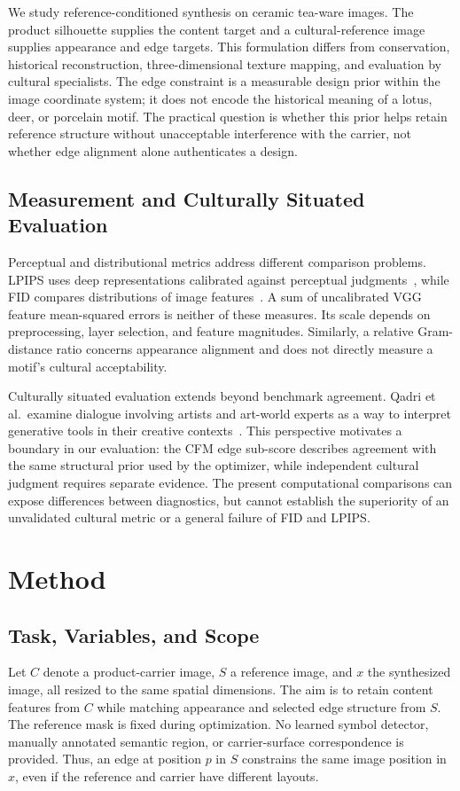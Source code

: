 \documentclass[manuscript,acmlarge,screen,review]{acmart}
\begin{document}
We study reference-conditioned synthesis on ceramic tea-ware images. The product silhouette supplies the content target and a cultural-reference image supplies appearance and edge targets. This formulation differs from conservation, historical reconstruction, three-dimensional texture mapping, and evaluation by cultural specialists. The edge constraint is a measurable design prior within the image coordinate system; it does not encode the historical meaning of a lotus, deer, or porcelain motif. The practical question is whether this prior helps retain reference structure without unacceptable interference with the carrier, not whether edge alignment alone authenticates a design.

\subsection{Measurement and Culturally Situated Evaluation}
Perceptual and distributional metrics address different comparison problems. LPIPS uses deep representations calibrated against perceptual judgments~\cite{zhang2018lpips}, while FID compares distributions of image features~\cite{heusel2017fid}. A sum of uncalibrated VGG feature mean-squared errors is neither of these measures. Its scale depends on preprocessing, layer selection, and feature magnitudes. Similarly, a relative Gram-distance ratio concerns appearance alignment and does not directly measure a motif's cultural acceptability.

Culturally situated evaluation extends beyond benchmark agreement. Qadri et al.\ examine dialogue involving artists and art-world experts as a way to interpret generative tools in their creative contexts~\cite{qadri2024}. This perspective motivates a boundary in our evaluation: the CFM edge sub-score describes agreement with the same structural prior used by the optimizer, while independent cultural judgment requires separate evidence. The present computational comparisons can expose differences between diagnostics, but cannot establish the superiority of an unvalidated cultural metric or a general failure of FID and LPIPS.

\section{Method}
\label{sec:method}

\subsection{Task, Variables, and Scope}
Let $C$ denote a product-carrier image, $S$ a reference image, and $x$ the synthesized image, all resized to the same spatial dimensions. The aim is to retain content features from $C$ while matching appearance and selected edge structure from $S$. The reference mask is fixed during optimization. No learned symbol detector, manually annotated semantic region, or carrier-surface correspondence is provided. Thus, an edge at position $p$ in $S$ constrains the same image position in $x$, even if the reference and carrier have different layouts.
\end{document}
